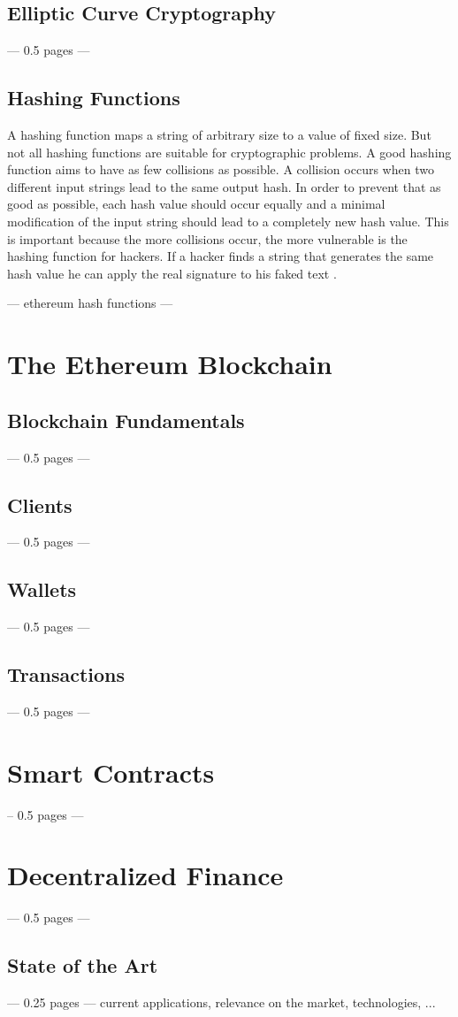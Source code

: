 \subsection{Elliptic Curve Cryptography}
--- 0.5 pages ---
\subsection{Hashing Functions}
A hashing function maps a string of arbitrary size to a value of fixed size. But not all hashing functions are suitable for cryptographic problems. A good hashing function aims to have as few collisions as possible. A collision occurs when two different input strings lead to the same output hash. In order to prevent that as good as possible, each hash value should occur equally and a minimal modification of the input string should lead to a completely new hash value. This is important because the more collisions occur, the more vulnerable is the hashing function for hackers. If a hacker finds a string that generates the same hash value he can apply the real signature to his faked text \cite{Schmeh2007}.

--- ethereum hash functions --- 

\section{The Ethereum Blockchain}
\subsection{Blockchain Fundamentals}
--- 0.5 pages ---
\subsection{Clients}
--- 0.5 pages ---
\subsection{Wallets}
--- 0.5 pages ---
\subsection{Transactions}
--- 0.5 pages ---
\section{Smart Contracts}
-- 0.5 pages ---
\section{Decentralized Finance}
--- 0.5 pages ---
\subsection{State of the Art}
--- 0.25 pages ---
current applications, relevance on the market, technologies, ...
